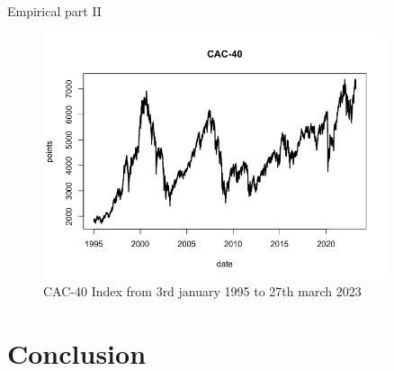 Empirical part II

\begin{figure}[h]
    \centering
    \includegraphics[width=0.9\textwidth]{figures/cac-40}
    \caption{CAC-40 Index from 3rd january 1995 to 27th march 2023}
\end{figure}

\chapter{Conclusion}


